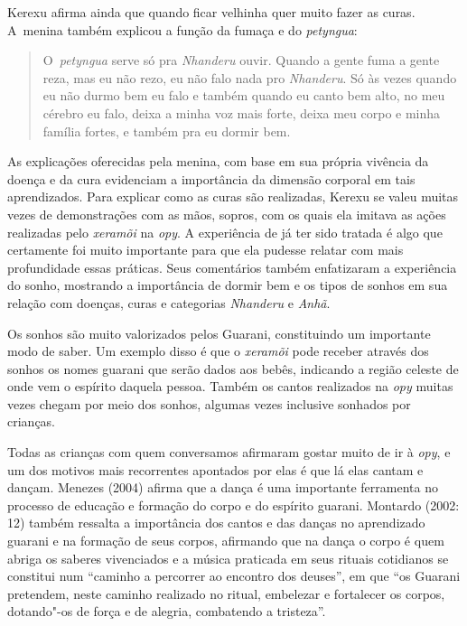 Kerexu afirma ainda que quando ficar velhinha quer muito fazer as curas.
A~menina também explicou a função da fumaça e do \emph{petyngua}:

\begin{quote}
\noindent
O~\emph{petyngua} serve só pra \emph{Nhanderu} ouvir. Quando a gente fuma a gente
reza, mas eu não rezo, eu não falo nada pro \emph{Nhanderu}. Só às vezes
quando eu não durmo bem eu falo e também quando eu canto bem alto, no
meu cérebro eu falo, deixa a minha voz mais forte, deixa meu corpo e
minha família fortes, e também pra eu dormir bem.
\end{quote}

As explicações oferecidas pela menina, com base em sua própria vivência
da doença e da cura evidenciam a importância da dimensão corporal em
tais aprendizados. Para explicar como as curas são realizadas, Kerexu
se valeu muitas vezes de demonstrações com as mãos, sopros, com os
quais ela imitava as ações realizadas pelo \emph{xeramõi} na \emph{opy}. A
experiência de já ter sido tratada é algo que certamente foi muito
importante para que ela pudesse relatar com mais profundidade essas
práticas. Seus comentários também enfatizaram a experiência do sonho,
mostrando a importância de dormir bem e os tipos de sonhos em sua
relação com doenças, curas e categorias \emph{Nhanderu} e \emph{Anhã}.

Os sonhos são muito valorizados pelos Guarani, constituindo um
importante modo de saber. Um exemplo disso é que o \emph{xeramõi} pode receber
através dos sonhos os nomes guarani que serão dados aos bebês,
indicando a região celeste de onde vem o espírito daquela pessoa.
Também os cantos realizados na \emph{opy} muitas vezes chegam por meio dos
sonhos, algumas vezes inclusive sonhados por crianças.

Todas as crianças com quem conversamos afirmaram gostar muito de ir à
\emph{opy}, e um dos motivos mais recorrentes apontados por elas é que lá elas
cantam e dançam. Menezes (2004) afirma que a dança é uma importante
ferramenta no processo de educação e formação do corpo e do espírito
guarani. Montardo (2002: 12) também
ressalta a importância dos cantos e das danças no aprendizado guarani e
na formação de seus corpos, afirmando que na dança o corpo é quem
abriga os saberes vivenciados e a música praticada em seus rituais
cotidianos se constitui num ``caminho a percorrer ao encontro dos
deuses'', em que ``os Guarani pretendem, neste caminho realizado no
ritual, embelezar e fortalecer os corpos, dotando"-os de força e de
alegria, combatendo a tristeza''.

